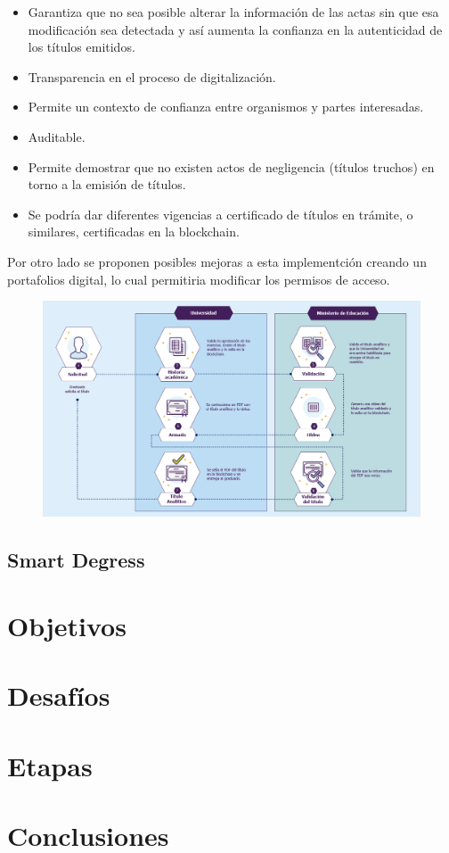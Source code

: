 \documentclass[11pt,a4paper]{article}
\begin{document}
        \begin{itemize}
            \item Garantiza que no sea posible alterar la 
            información de las actas sin que esa modificación sea detectada y así aumenta la confianza en la autenticidad de los títulos emitidos. 
            \item Transparencia en el proceso de digitalización.
            \item Permite un contexto de confianza entre organismos y partes interesadas. 
            \item Auditable.
            \item Permite demostrar que no existen actos de negligencia (títulos truchos) en torno a la emisión de títulos.
            \item Se podría dar diferentes vigencias a certificado de títulos en trámite, o similares, certificadas en la blockchain.
        \end{itemize}

        Por otro lado se proponen posibles mejoras a esta implementción creando un portafolios digital, lo cual 
        permitiria modificar los permisos de acceso.

        \begin{figure}
            \centering
            \includegraphics[width=\textwidth]{Img/cuadro_problematica.png}
            \caption{}
            \label{fig:cuadro_problematica}
        \end{figure}

        \subsection{Smart Degress}



    \section{Objetivos}

    \section{Desafíos}

    \section{Etapas}

    \section{Conclusiones}
\end{document}
